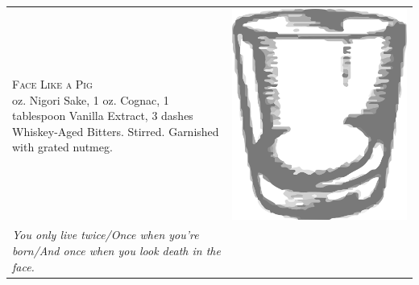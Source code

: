 \documentclass{article}
\begin{document}
\begin{tabular}{*{2}{m{}}}
{\raggedleft\huge\textsc{Face Like a Pig}\\*}
\raggedleft 2 oz. Nigori Sake, 1 oz. Cognac, 1 tablespoon Vanilla Extract, 3 dashes Whiskey-Aged Bitters. Stirred. Garnished with grated nutmeg. & \includegraphics{rocks_glass.png}\\
\raggedleft\small\textit{You only live twice/Once when you're born/And once when you look death in the face.}
\end{tabular}
\end{document}
